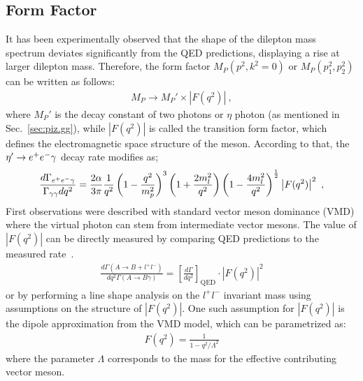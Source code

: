   \subsection{Form Factor}
   It has been experimentally observed that the shape of the dilepton mass spectrum deviates significantly from the QED predictions, displaying a rise at larger dilepton mass. Therefore, the form factor ${M}_P(p^2,k^2=0)$ or ${M}_P(p_{1}^2,p_{2}^2)$  can be written as follows:
  \begin{align}
  {M}_P \to {M}_P' \times \left|F(q^2)\right| \ ,
  \end{align}
  where $M_P'$ is the decay constant of two photons or $\eta$ photon (as mentioned in Sec.~\ref{sec:piz.gg}), while $\left|F(q^2)\right|$ is called the transition form factor, which defines the electromagnetic space structure of the meson. According to that, the $\eta^{\prime} \to e^+e^- \gamma$ decay rate modifies as;
  \begin{align}\label{eq:eegff.final}
  \frac{d\Gamma_{e^+e^- \gamma}}{\Gamma_{\gamma\gamma} dq^2} = \frac{2 \alpha}{3 \pi} \frac{1}{q^2} \left( 1- \frac{q^2}{m_p^2}\right)^3 \left( 1+ \frac{2m_l^2}{q^2}\right) \left( 1- \frac{4m_l^2}{q^2}\right)^{\frac{1}{2}} \left|F(q^2)\right|^2 \ ,
  \end{align}
  First observations were described with standard vector meson dominance (VMD) where the virtual photon can stem from intermediate vector mesons. 
  The value of $\left|F(q^2)\right|$ can be directly measured by comparing QED predictions to the measured rate~\cite{landsberg}. 
  \begin{align}
  \frac{d\Gamma(A\to B+l^+l^-)}{dq^2 \Gamma(A\to B\gamma)} = \left[\frac{d\Gamma}{dq^2}\right]_{\text{QED}} \cdot \left | F(q^2) \right |^2 
  \end{align}
  or by performing a line shape analysis on the $l^{+}l^{-}$ invariant mass using assumptions on the structure of $\left|F(q^2)\right|$. One such assumption for $\left|F(q^2)\right|$ is the dipole approximation from the VMD model, which can be parametrized as:
  \begin{align}
  F(q^2) = \frac{1}{1-q^2/\Lambda^2} 
  \end{align}
   where the parameter $\Lambda$ corresponds to the mass for the effective contributing vector meson.

